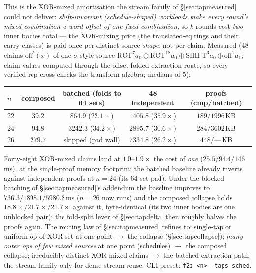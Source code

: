 \documentclass[11pt]{article}
\DeclareRobustCommand{\code}[1]{{\def\_{\textunderscore\allowbreak}\texttt{#1}}}
\theoremstyle{plain}
\theoremstyle{definition}
\theoremstyle{remark}
\begin{document}
This is the XOR-mixed amortisation the stream family of
\S\ref{sec:tapmeasured} could not deliver: \emph{shift-invariant
(schedule-shaped) workloads make every round's mixed combination a
word-offset of one fixed combination}, so $k$ rounds cost \emph{two}
inner bodies total --- the XOR-mixing price (the translated-eq rings
and their carry classes) is paid once per distinct source
\emph{shape}, not per claim. Measured ($48$ claims
$\mathrm{off}^{t}(x)$ of one $\sigma$-style source
$\mathrm{ROT}^{7}a_0\oplus\mathrm{ROT}^{18}a_0\oplus
\mathrm{SHIFT}^{3}a_0\oplus\mathrm{off}^{1}a_1$; claim values
computed through the offset-folded extraction route, so every
verified rep cross-checks the transform algebra; medians of 5):

\begin{center}\small
\begin{tabular}{@{}lcccc@{}}
\toprule
$n$ & composed & batched (folds to 64 sets) & 48 independent &
proofs (cmp/batched)\\
\midrule
22 & $\mathbf{39.2}$ & $864.9$ \;($22.1\times$) & $1405.8$ \;($35.9\times$) & $189/1996$\,KB\\
24 & $\mathbf{94.8}$ & $3242.3$ \;($34.2\times$) & $2895.7$ \;($30.6\times$) & $284/3602$\,KB\\
26 & $\mathbf{279.7}$ & skipped (pad wall) & $7334.8$ \;($26.2\times$) & $448/\text{---}$\,KB\\
\bottomrule
\end{tabular}
\end{center}

\noindent Forty-eight XOR-mixed claims land at $1.0$--$1.9\times$ the
cost of \emph{one} ($25.5/94.4/146$\,ms), at the single-proof memory
footprint; the batched baseline already inverts against independent
proofs at $n{=}24$ (its $64$-set pad). Under the blocked batching of
\S\ref{sec:tapmeasured}'s addendum the baseline improves to
$736.3/1898.1/5980.8$\,ms ($n{=}26$ now runs) and the composed
collapse holds $18.8\times/21.7\times/21.7\times$ against it,
byte-identical (its two inner bodies are one unblocked pair); the
fold-split lever of \S\ref{sec:tapdelta} then roughly halves the
proofs again. The routing law of
\S\ref{sec:tapmeasured} refines to: single-tap or uniform-op-of-XOR-set
at one point $\to$ the collapse (\S\ref{sec:tapcollapse}); \emph{many
outer ops of few mixed sources} at one point (schedules) $\to$ the
composed collapse; irreducibly distinct XOR-mixed claims $\to$ the
batched extraction path; the stream family only for dense stream
reuse. CLI preset: \code{f2z <n> --taps sched}.
\end{document}
